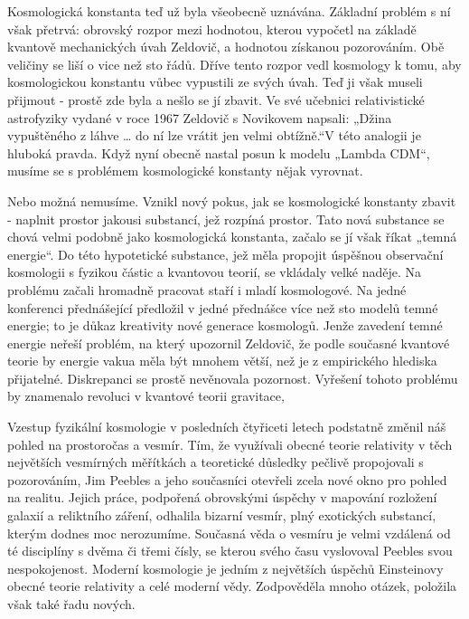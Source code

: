   Kosmologická konstanta teď už byla všeobecně uznávána. Základní problém s ní však přetrvá:
  obrovský rozpor mezi hodnotou, kterou vypočetl na základě kvantově mechanických úvah Zeldovič, a
  hodnotou získanou pozorováním. Obě veličiny se liší o vice než sto řádů. Dříve tento rozpor vedl
  kosmology k tomu, aby kosmologickou konstantu vůbec vypustili ze svých úvah. Teď ji však museli
  přijmout - prostě zde byla a nešlo se jí zbavit. Ve své učebnici relativistické astrofyziky vydané
  v roce 1967 Zeldovič s Novikovem napsali: „Džina vypuštěného z láhve … do ní lze vrátit jen velmi
  obtížně.“V této analogii je hluboká pravda. Když nyní obecně nastal posun k modelu „Lambda CDM“,
  musíme se s problémem kosmologické konstanty nějak vyrovnat. 
  
  Nebo možná nemusíme. Vznikl nový pokus, jak se kosmologické konstanty zbavit - naplnit prostor
  jakousi substancí, jež rozpíná prostor. Tato nová substance se chová velmi podobně jako
  kosmologická konstanta, začalo se jí však říkat „temná energie“. Do této hypotetické substance,
  jež měla propojit úspěšnou observační kosmologii s fyzikou částic a kvantovou teorií, se vkládaly
  velké naděje. Na problému začali hromadně pracovat staří i mladí kosmologové. Na jedné konferenci
  přednášející předložil v jedné přednášce více než sto modelů temné energie; to je důkaz kreativity
  nové generace kosmologů. Jenže zavedení temné energie neřeší problém, na který upozornil Zeldovič,
  že podle současné kvantové teorie by energie vakua měla být mnohem větší, než je z empirického
  hlediska přijatelné. Diskrepanci se prostě nevěnovala pozornost. Vyřešení tohoto problému by
  znamenalo revoluci v kvantové teorii gravitace, 
  
  Vzestup fyzikální kosmologie v posledních čtyřiceti letech podstatně změnil náš pohled na
  prostoročas a vesmír. Tím, že využívali obecné teorie relativity v těch největších vesmírných
  měřítkách a teoretické důsledky pečlivě propojovali s pozorováním, Jim Peebles a jeho současníci
  otevřeli zcela nové okno pro pohled na realitu. Jejich práce, podpořená obrovskými úspěchy v
  mapování rozložení galaxií a reliktního záření, odhalila bizarní vesmír, plný exotických
  substancí, kterým dodnes moc nerozumíme. Současná věda o vesmíru je velmi vzdálená od té
  disciplíny s dvěma či třemi čísly, se kterou svého času vyslovoval Peebles svou nespokojenost.
  Moderní kosmologie je jedním z největších úspěchů Einsteinovy obecné teorie relativity a celé
  moderní vědy. Zodpověděla mnoho otázek, položila však také řadu nových.


